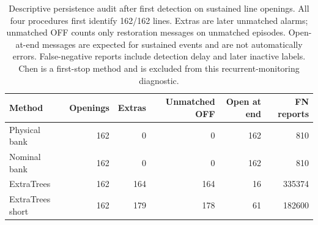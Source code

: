 \begin{table}[t]\centering\small
\caption{Descriptive persistence audit after first detection on sustained line openings. All four procedures first identify 162/162 lines. Extras are later unmatched alarms; unmatched OFF counts only restoration messages on unmatched episodes. Open-at-end messages are expected for sustained events and are not automatically errors. False-negative reports include detection delay and later inactive labels. Chen is a first-stop method and is excluded from this recurrent-monitoring diagnostic.}
\label{tab:review_persistence}
\begin{tabular}{lrrrrr}\toprule
Method & Openings & Extras & Unmatched OFF & Open at end & FN reports\\\midrule
Physical bank & 162 & 0 & 0 & 162 & 810\\
Nominal bank & 162 & 0 & 0 & 162 & 810\\
ExtraTrees & 162 & 164 & 164 & 16 & 335374\\
ExtraTrees short & 162 & 179 & 178 & 61 & 182600\\
\bottomrule\end{tabular}
\end{table}

